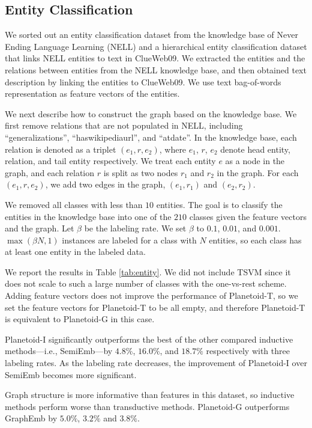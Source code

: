 \subsection{Entity Classification}

We sorted out an entity classification dataset from the knowledge base of Never Ending Language Learning (NELL)
\cite{carlson2010toward} and a hierarchical entity classification dataset \cite{dalvi2014hierarchical}
that links NELL entities to text in ClueWeb09. We extracted the entities and the relations between entities from the NELL knowledge base, and then obtained text description by linking the entities to ClueWeb09. We use text bag-of-words representation as feature vectors of the entities.

We next describe how to construct the graph based on the knowledge base. We first remove relations that are not populated in NELL, including ``generalizations'', ``haswikipediaurl'', and ``atdate''. In the knowledge base, each relation is denoted as a triplet $(e_1, r, e_2)$, where $e_1$, $r$, $e_2$ denote head entity, relation, and tail entity respectively. We treat each entity $e$ as a node in the graph, and each relation $r$ is split as two nodes $r_1$ and $r_2$ in the graph. For each $(e_1, r, e_2)$, we add two edges in the graph, $(e_1, r_1)$ and $(e_2, r_2)$.

We removed all classes with less than $10$ entities. The goal is to classify the entities in the knowledge base into one of the $210$ classes given the feature vectors and the graph. Let $\beta$ be the labeling rate. We set $\beta$ to $0.1$, $0.01$, and $0.001$. $\max(\beta N, 1)$ instances are labeled for a class with $N$ entities, so each class has at least one entity in the labeled data.

We report the results in Table \ref{tab:entity}. We did not include TSVM since it does not scale to such a large number of classes with the one-vs-rest scheme. Adding feature vectors does not improve the performance of Planetoid-T, so we set the feature vectors for Planetoid-T to be all empty, and therefore Planetoid-T is equivalent to Planetoid-G in this case.

Planetoid-I significantly outperforms the best of the other compared inductive methods---i.e., SemiEmb---by $4.8\%$, $16.0\%$, and $18.7\%$ respectively with three labeling rates. As the labeling rate decreases, the improvement of Planetoid-I over SemiEmb becomes more significant.

Graph structure is more informative than features in this dataset, so inductive methods perform worse than transductive methods. Planetoid-G outperforms GraphEmb by $5.0\%$, $3.2\%$ and $3.8\%$.





